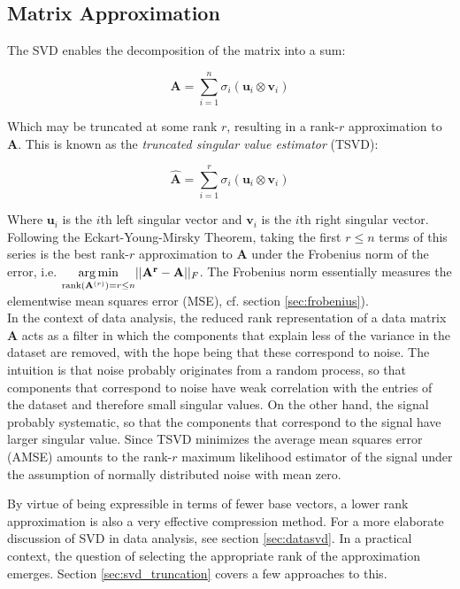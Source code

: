 \subsection{Matrix Approximation}
The SVD enables the decomposition of the matrix into a sum:

\begin{equation}
\mathbf{A} = \sum_{i=1}^n \sigma_i (\mathbf{u}_i \otimes \mathbf{v}_i)
\end{equation}

Which may be truncated at some rank $r$, resulting in a rank-$r$ approximation to $\mathbf{A}$. This is known as the \textit{truncated singular value estimator} (TSVD):

\begin{equation}
\mathbf{\hat{A}} = \sum_{i=1}^r \sigma_i (\mathbf{u}_i \otimes \mathbf{v}_i)
\end{equation}

Where $\mathbf{u}_i$ is the $i$th left singular vector and $\mathbf{v}_i$ is the $i$th right singular vector. Following the Eckart-Young-Mirsky Theorem, taking the first $r \leq n$ terms of this series is the best rank-$r$ approximation to $\mathbf{A}$ under the Frobenius norm of the error, i.e.  $\underset{\mathrm{rank}(\mathbf{A}^{(r)})=r\leq n}{\operatorname*{arg\,min}} ||\mathbf{A^r}-\mathbf{A}||_F$. The Frobenius norm essentially measures the elementwise mean squares error (MSE), cf. section \ref{sec:frobenius}).\\

In the context of data analysis, the reduced rank representation of a data matrix $\mathbf{A}$ acts as a filter in which the components that explain less of the variance in the dataset are removed, with the hope being that these correspond to noise. The intuition is that noise probably originates from a random process, so that components that correspond to noise have weak correlation with the entries of the dataset and therefore small singular values. On the other hand, the signal probably systematic, so that the components that correspond to the signal have larger singular value. Since TSVD minimizes the average mean squares error (AMSE) amounts to the rank-$r$ maximum likelihood estimator of the signal under the assumption of normally distributed noise with mean zero. 

By virtue of being expressible in terms of fewer base vectors, a lower rank approximation is also a very effective compression method. For a more elaborate discussion of SVD in data analysis, see section \ref{sec:datasvd}. In a practical context, the question of selecting the appropriate rank of the approximation emerges. Section \ref{sec:svd_truncation} covers a few approaches to this.



